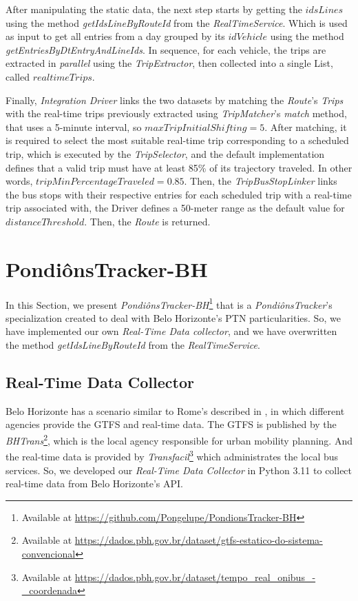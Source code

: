 After manipulating the static data, the next step starts by getting the $idsLines$ using the method 
\textit{getIdsLineByRouteId} from the \textit{RealTimeService}. Which is used as input to get all entries
from a day grouped by its $idVehicle$ using the method \textit{getEntriesByDtEntryAndLineIds}. In sequence, for each
vehicle, the trips are extracted in {\em parallel} using the \textit{TripExtractor}, then collected into a single
List, called $realtimeTrips$.

Finally, { \em Integration Driver} links the two datasets by matching the \textit{Route}'s \textit{Trips} 
with the real-time trips previously extracted using \textit{TripMatcher}'s \textit{match} method, that
uses a 5-minute interval, so $maxTripInitialShifting = 5$.
After matching,
it is required to select the most suitable real-time trip corresponding to a scheduled trip, which is executed by 
the \textit{TripSelector}, and the default implementation defines that a valid trip must have at least 85\% of its trajectory traveled. In other words, $tripMinPercentageTraveled = 0.85$. Then, the \textit{TripBusStopLinker}
links the bus stops with their respective entries for each scheduled trip with a real-time trip associated with,
the Driver defines a 50-meter range as the default value for $distanceThreshold$. Then, the \textit{Route} is returned.


\section{PondiônsTracker-BH}
In this Section, we present \textit{PondiônsTracker-BH}\footnote{Available at \url{https://github.com/Pongelupe/PondionsTracker-BH}} that is a \textit{PondiônsTracker}'s specialization created to
deal with Belo Horizonte's PTN particularities. So, we have implemented our own \textit{Real-Time Data collector}, and we have overwritten the method \textit{getIdsLineByRouteId} from the 
\textit{RealTimeService}.

\subsection{Real-Time Data Collector}
Belo Horizonte has a scenario similar to Rome's described in , in which  
different agencies provide the GTFS and real-time data. The GTFS is published
by the \textit{BHTrans}\footnote{Available at \url{https://dados.pbh.gov.br/dataset/gtfs-estatico-do-sistema-convencional}}, 
which is the local agency responsible for urban mobility planning. And 
the real-time data is provided by \textit{Transfacil}\footnote{Available at \url{https://dados.pbh.gov.br/dataset/tempo_real_onibus_-_coordenada}} which administrates the local bus services.
So, we developed our \textit{Real-Time Data Collector} in Python 3.11 to 
collect real-time data from Belo Horizonte's API.


